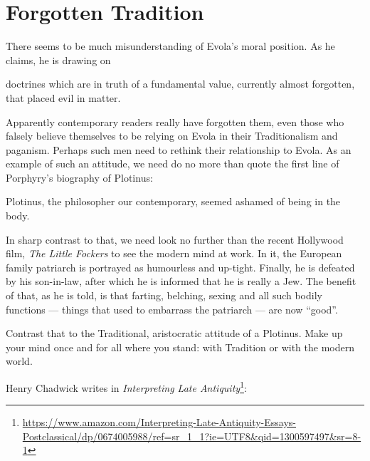 \section{Forgotten Tradition}

There seems to be much misunderstanding of Evola's moral position. As he claims, he is drawing on

\begin{quotex}
doctrines which are in truth of a fundamental value, currently almost forgotten, that placed evil in matter.
\end{quotex}


Apparently contemporary readers really have forgotten them, even those who falsely believe themselves to be relying on Evola in their Traditionalism and paganism. Perhaps such men need to rethink their relationship to Evola. As an example of such an attitude, we need do no more than quote the first line of Porphyry's biography of Plotinus:

\begin{quotex}
Plotinus, the philosopher our contemporary, seemed ashamed of being in the body.
\end{quotex}


In sharp contrast to that, we need look no further than the recent Hollywood film, \emph{The Little Fockers} to see the modern mind at work. In it, the European family patriarch is portrayed as humourless and up-tight. Finally, he is defeated by his son-in-law, after which he is informed that he is really a Jew. The benefit of that, as he is told, is that farting, belching, sexing and all such bodily functions --- things that used to embarrass the patriarch --- are now ``good''.

Contrast that to the Traditional, aristocratic attitude of a Plotinus. Make up your mind once and for all where you stand: with Tradition or with the modern world.

Henry Chadwick writes in \textit{Interpreting Late Antiquity}\footnote{\url{https://www.amazon.com/Interpreting-Late-Antiquity-Essays-Postclassical/dp/0674005988/ref=sr\_1\_1?ie=UTF8&qid=1300597497&sr=8-1}}: 

